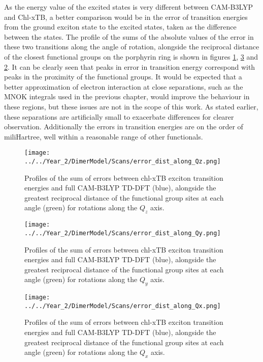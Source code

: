 As the energy value of the excited states is very different between CAM-B3LYP and
Chl-xTB, a better comparison would be in the error of transition energies from the
ground exciton state to the excited states, taken as the difference between the 
states. The profile of the sums of the absolute values of the error in these two
transitions along the angle of rotation, alongside the reciprocal distance of the
closest functional groups on the porphyrin ring is shown in figures \ref{fig:error_along_qz}, 
\ref{fig:error_along_qx} and \ref{fig:error_along_qy}. It can be clearly seen that
peaks in error in transition energy correspond with peaks in the proximity of the
functional groups. It would be expected that a better approximation of electron 
interaction at close separations, such as the MNOK integrals used in the previous
chapter, would improve the behaviour in these regions, but these issues are not 
in the scope of this work. As stated earlier, these separations are artificially 
small to exacerbate differences for clearer observation. Additionally the errors 
in transition energies are on the order of miliHartree, well within a reasonable
range of other functionals.

\begin{figure}
    \centering
    \texttt{[image: ../../Year\_2/DimerModel/Scans/error\_dist\_along\_Qz.png]}
    \caption{Profiles of the sum of errors between chl-xTB exciton transition energies
    and full CAM-B3LYP TD-DFT (blue), alongside the greatest reciprocal distance
    of the functional group sites at each angle (green) for rotations along the
    $Q_z$ axis.}
    \label{fig:error_along_qz}
\end{figure}

\begin{figure}
    \centering
    \texttt{[image: ../../Year\_2/DimerModel/Scans/error\_dist\_along\_Qy.png]}
    \caption{Profiles of the sum of errors between chl-xTB exciton transition energies
    and full CAM-B3LYP TD-DFT (blue), alongside the greatest reciprocal distance
    of the functional group sites at each angle (green) for rotations along the
    $Q_y$ axis.}
    \label{fig:error_along_qy}
\end{figure}

\begin{figure}
    \centering
    \texttt{[image: ../../Year\_2/DimerModel/Scans/error\_dist\_along\_Qx.png]}
    \caption{Profiles of the sum of errors between chl-xTB exciton transition energies
    and full CAM-B3LYP TD-DFT (blue), alongside the greatest reciprocal distance
    of the functional group sites at each angle (green) for rotations along the
    $Q_x$ axis.}
    \label{fig:error_along_qx}
\end{figure}

